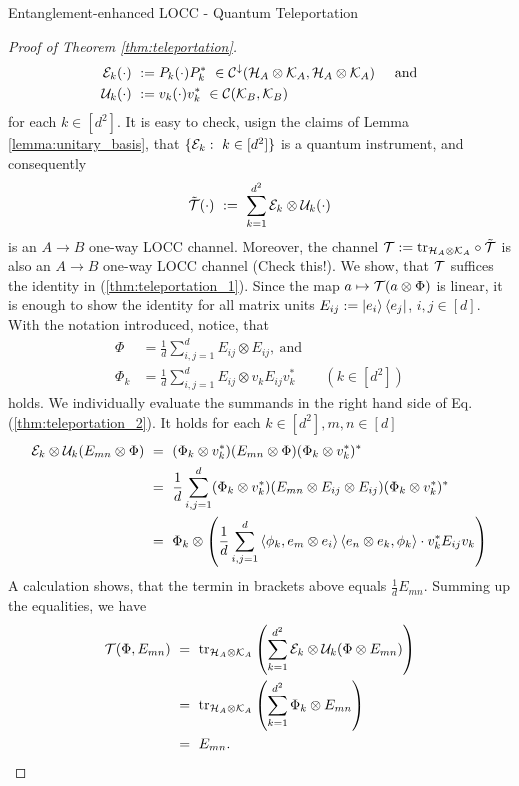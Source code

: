 \begin{subsection}{Entanglement-enhanced LOCC - Quantum Teleportation}
\begin{proof}[Proof of Theorem \ref{thm:teleportation}]
\begin{align} 
 {\mathcal E}_k(\cdot) \ &:= P_k (\cdot) P_k^\ast \ \in {\mathcal C}^{\downarrow}({\mathcal H}_A \otimes {\mathcal K}_A, {\mathcal H}_A \otimes {\mathcal K}_A)\hspace{.5cm} \text{and} \\
 {\mathcal U}_k(\cdot) \ &:= v_k(\cdot)v_k^\ast \ \in {\mathcal C}({\mathcal K}_B, {\mathcal K}_B) 
\end{align}
for each $k \in [d^2]$. It is easy to check, usign the claims of Lemma \ref{lemma:unitary_basis}, that 
$\{{\mathcal E}_k: \ k \in [d^2]\}$ is a quantum instrument, and consequently
\begin{align}
\tilde{{\mathcal T}}(\cdot) \ := \ \sum_{k=1}^{d^2} {\mathcal E}_k \otimes {\mathcal U}_k(\cdot) \label{thm:teleportation_2}
\end{align}
is an $A\rightarrow B$ one-way LOCC channel. Moreover, the channel ${\mathcal T} := \mathrm{tr}_{{\mathcal H}_A \otimes {\mathcal K}_A} \circ \tilde{{\mathcal T}}$ is also an $A\rightarrow B$ one-way LOCC channel (Check this!). We show, that ${\mathcal T}$ 
suffices the identity in (\ref{thm:teleportation_1}). Since the map $a \mapsto {\mathcal T}(a \otimes \Phi)$ is linear, it is enough to show the identity for all matrix units $E_{ij} := \ket{e_i}\bra{e_j}$, $i,j \in [d]$. With the notation introduced, notice, that 
\begin{align}
\Phi &= \frac{1}{d} \sum_{i,j=1}^d E_{ij} \otimes E_{ij}, \ \text{and} \\
\Phi_k& = \frac{1}{d} \sum_{i,j=1}^d E_{ij} \otimes v_kE_{ij}v_k^\ast &&(k \in [d^2])
\end{align}
holds. We individually evaluate the summands in the right hand side of Eq. (\ref{thm:teleportation_2}). It holds for each $k \in [d^2], m,n \in [d]$
\begin{align}
 {\mathcal E}_k \otimes {\mathcal U}_k (E_{mn} \otimes \Phi)  \
 &= \ (\Phi_k \otimes v_k^\ast)(E_{mn} \otimes \Phi) (\Phi_k \otimes v_k^\ast)^\ast \\
 &= \ \frac{1}{d} \sum_{i,j=1}^d (\Phi_k \otimes v_k^\ast) (E_{mn} \otimes E_{ij} \otimes E_{ij})(\Phi_k \otimes v_k^\ast)^\ast \\
 &= \ \Phi_k \otimes \left(\frac{1}{d} \sum_{i,j=1}^d \braket{\phi_k, e_m \otimes e_i}\braket{e_n \otimes e_k, \phi_k} \cdot v_k^\ast E_{ij} v_k\right)
\end{align}
A calculation shows, that the termin in brackets above equals $\frac{1}{d} E_{mn}$. Summing up the equalities, we have
\begin{align}
\cT(\Phi, E_{mn}) \ 
 & = \ \tr_{\cH_A \otimes \cK_A}\left(\sum_{k=1}^{d^2} \cE_k \otimes \cU_k (\Phi \otimes E_{mn}) \right) \\
 & = \ \tr_{\cH_A \otimes \cK_A}\left(\sum_{k=1}^{d^2} \Phi_k \otimes E_{mn}\right) \\
 & = \ E_{mn}.
\end{align}
\end{proof}
\end{subsection}
